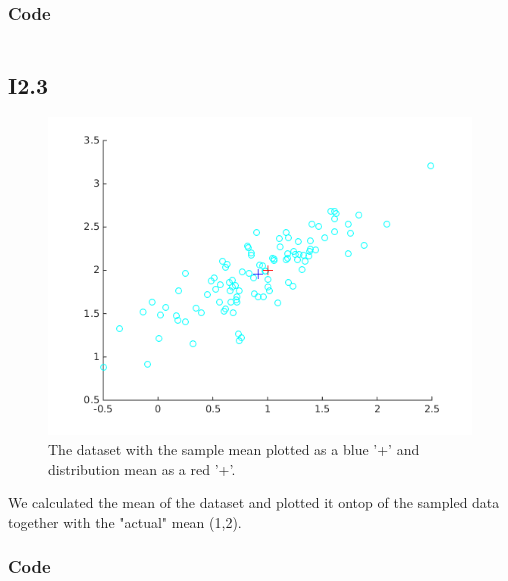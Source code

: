 \documentclass{article}
\begin{document}
\subsubsection{Code}

\inputminted{matlab}{part1/i22john.m}

\subsection{I2.3}


\begin{figure}[h!]
    \centering
    \includegraphics[width=\textwidth]{part1/I231.png}
    \caption{The dataset with the sample mean plotted as a blue '+' and
    distribution mean as a red '+'.}
    \label{fig:I3.1}
\end{figure}

We calculated the mean of the dataset and plotted it ontop of the sampled
data together with the "actual" mean (1,2).

\subsubsection{Code}

\inputminted{matlab}{part1/i23john.m}
\end{document}

